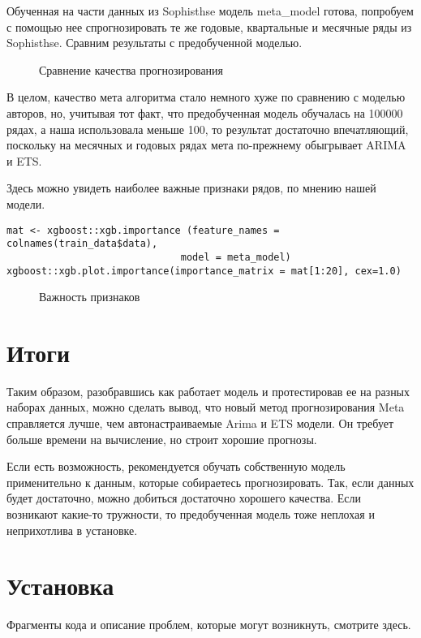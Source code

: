 \documentclass[a4paper,12pt]{article}
\theoremstyle{plain} %
\theoremstyle{definition} %
\theoremstyle{remark} %
\begin{document}
Обученная на части данных из Sophisthse модель meta\_model готова, попробуем с помощью нее спрогнозировать те же годовые, квартальные и месячные ряды из Sophisthse.
Сравним результаты с предобученной моделью.

\begin{figure}[H]
  \noindent{}
  \caption{Сравнение качества прогнозирования}
\end{figure}

В целом, качество мета алгоритма стало немного хуже по сравнению с моделью авторов, но, учитывая тот факт, что предобученная модель обучалась на 100000 рядах, а наша использовала меньше 100, то результат достаточно впечатляющий, поскольку на месячных и годовых рядах мета по-прежнему обыгрывает ARIMA и ETS.

Здесь можно увидеть наиболее важные признаки рядов, по мнению нашей модели.
\begin{verbatim}
mat <- xgboost::xgb.importance (feature_names = colnames(train_data$data),
                              model = meta_model)
xgboost::xgb.plot.importance(importance_matrix = mat[1:20], cex=1.0)

\end{verbatim}

\begin{figure}[H]
  \noindent{}
  \caption{Важность признаков}
\end{figure}


\section{Итоги}

Таким образом, разобравшись как работает модель и протестировав ее на разных наборах данных, можно сделать вывод, что новый метод прогнозирования Meta справляется лучше, чем автонастраиваемые Arima и ETS модели. Он требует больше времени на вычисление, но строит хорошие прогнозы.

Если есть возможность, рекомендуется обучать собственную модель применительно к данным, которые собираетесь прогнозировать. Так, если данных будет достаточно, можно добиться достаточно хорошего качества. Если возникают какие-то тружности, то предобученная модель тоже неплохая и неприхотлива в установке.


\section{Установка}
Фрагменты кода и описание проблем, которые могут возникнуть, смотрите здесь.
\end{document}
